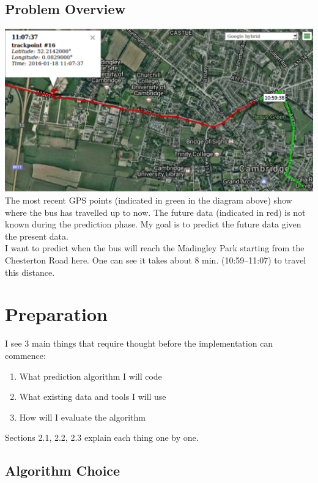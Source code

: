 \documentclass[12pt,a4paper,oneside,openright]{report}
\begin{document}
\section{Problem Overview}

\includegraphics[width=\textwidth]{figs/problem_overview.png} \\

The most recent GPS points (indicated in green in the diagram above) show
where the bus has travelled up to now. The future data (indicated in red)
is not known during the prediction phase. My goal is to predict the future
data given the present data. \\

I want to predict when the bus will reach the Madingley Park starting from the
Chesterton Road here. One can see it takes about 8 min. (10:59--11:07) to travel this distance.

\chapter{Preparation}

I see 3 main things that require thought before the implementation can commence:

\begin{enumerate}
\item What prediction algorithm I will code
\item What existing data and tools I will use
\item How will I evaluate the algorithm
\end{enumerate}

Sections 2.1, 2.2, 2.3 explain each thing one by one.

\section{Algorithm Choice}
\end{document}
